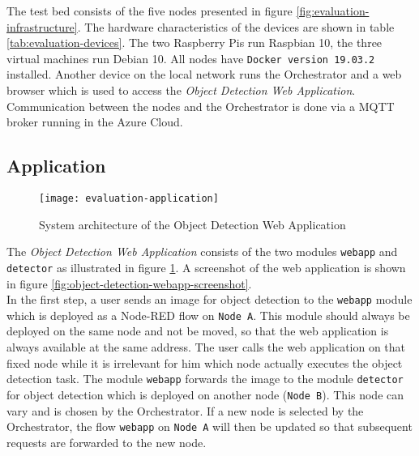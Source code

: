 The test bed consists of the five nodes presented in figure \ref{fig:evaluation-infrastructure}. The hardware characteristics of the devices are shown in table \ref{tab:evaluation-devices}. The two Raspberry Pis run Raspbian 10, the three virtual machines run Debian 10. All nodes have \texttt{Docker version 19.03.2} installed. Another device on the local network runs the Orchestrator and a web browser which is used to access the \textit{Object Detection Web Application}. Communication between the nodes and the Orchestrator is done via a MQTT broker running in the Azure Cloud.

\subsection{Application\label{sec:eval-application}}

\begin{figure}[htb]
    \centering
    \texttt{[image: evaluation-application]}
    \caption{System architecture of the Object Detection Web Application}
    \label{fig:evaluation-object-detection-application}
\end{figure}

The \textit{Object Detection Web Application} consists of the two modules \texttt{webapp} and \texttt{detector} as illustrated in figure \ref{fig:evaluation-object-detection-application}.
A screenshot of the web application is shown in figure \ref{fig:object-detection-webapp-screenshot}.\\

In the first step, a user sends an image for object detection to the \texttt{webapp} module which is deployed as a Node-RED flow on \texttt{Node A}.
This module should always be deployed on the same node and not be moved, so that the web application is always available at the same address.
The user calls the web application on that fixed node while it is irrelevant for him which node actually executes the object detection task.
The module \texttt{webapp} forwards the image to the module \texttt{detector} for object detection which is deployed on another node (\texttt{Node B}).
This node can vary and is chosen by the Orchestrator.
If a new node is selected by the Orchestrator, the flow \texttt{webapp} on \texttt{Node A} will then be updated so that subsequent requests are forwarded to the new node.\\


